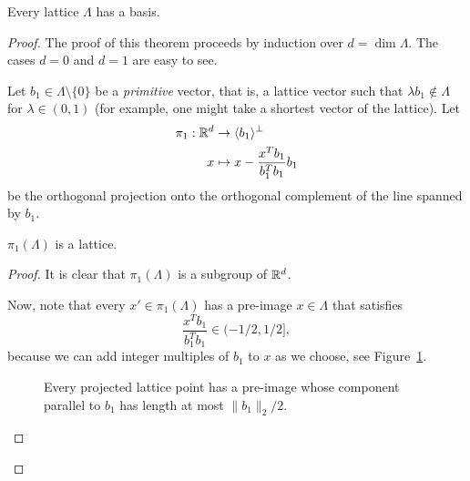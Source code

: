 \begin{lemma}
  \label{lemma:every-lattice-has-basis}
  Every lattice $\Lambda$ has a basis.
\end{lemma}
\begin{proof}
  The proof of this theorem proceeds by induction over $d = \dim \Lambda$.
  The cases $d = 0$ and $d = 1$ are easy to see.

  Let $b_1 \in \Lambda \setminus \{ 0 \}$ be a \emph{primitive} vector,
  that is, a lattice vector such that $\lambda b_1 \not\in \Lambda$ for $\lambda \in (0,1)$
  (for example, one might take a shortest vector of the lattice).
  Let
  \begin{align*}
    \pi_1 : \mathbb{R}^d & \to \langle b_1 \rangle^\bot \\
    x & \mapsto x - \frac{x^T b_1}{b_1^T b_1} b_1
  \end{align*}
  be the orthogonal projection onto the orthogonal complement of the line spanned by $b_1$.
  \begin{lemma}
    $\pi_1(\Lambda)$ is a lattice.
  \end{lemma}
  \begin{proof}
    It is clear that $\pi_1(\Lambda)$ is a subgroup of $\mathbb{R}^d$.

    Now, note that every $x' \in \pi_1(\Lambda)$ has a pre-image $x \in \Lambda$ that satisfies
    \[
      \frac{x^T b_1}{b_1^T b_1} \in (-1/2, 1/2],
    \]
    because we can add integer multiples of $b_1$ to $x$ as we choose,
    see Figure~\ref{fig:size-reduction}.

\begin{figure}
  \begin{center}
  \end{center}
  \caption{Every projected lattice point has a pre-image whose component parallel to $b_1$
    has length at most $\|b_1\|_2 / 2$.}
  \label{fig:size-reduction}
\end{figure}


\end{proof}
\end{proof}
